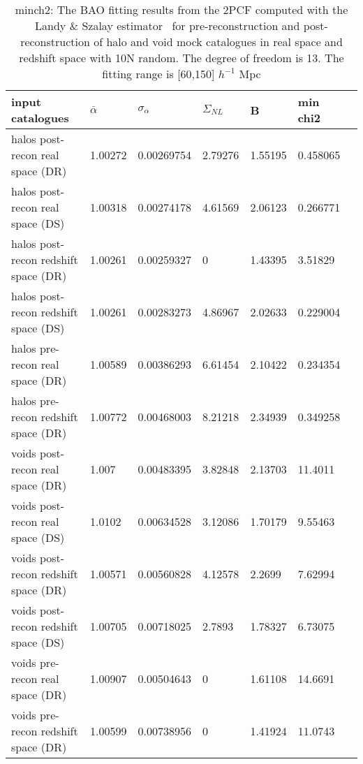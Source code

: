 \begin{table*}
\caption{minch2: The BAO fitting results from the 2PCF computed with the Landy $\&$ Szalay estimator~\cite{Landy1993} for pre-reconstruction and  post-reconstruction of halo and void mock catalogues in real space and redshift space with 10N random. The degree of freedom is 13. The fitting range is [60,150] $h^{-1}$ Mpc}
\label{tab:LS}
\begin{tabular}{lllllll}
\hline
input catalogues &  $\bar{\alpha}$ &  $\sigma_{\alpha}$ &       $\Sigma_{NL}$ &        B &  min chi2 \\
\hline
halos post-recon real space (DR)     & 1.00272 & 0.00269754 & 2.79276 & 1.55195 & 0.458065 \\
halos post-recon real space (DS)     & 1.00318 & 0.00274178 & 4.61569 & 2.06123 & 0.266771 \\
halos post-recon redshift space (DR) & 1.00261 & 0.00259327 & 0       & 1.43395 & 3.51829  \\
halos post-recon redshift space (DS) & 1.00261 & 0.00283273 & 4.86967 & 2.02633 & 0.229004 \\
halos pre-recon real space (DR)      & 1.00589 & 0.00386293 & 6.61454 & 2.10422 & 0.234354 \\
halos pre-recon redshift space (DR)  & 1.00772 & 0.00468003 & 8.21218 & 2.34939 & 0.349258 \\
\hline
voids post-recon real space (DR)     & 1.007   & 0.00483395 & 3.82848 & 2.13703 & 11.4011  \\
voids post-recon real space (DS)     & 1.0102  & 0.00634528 & 3.12086 & 1.70179 & 9.55463  \\
voids post-recon redshift space (DR) & 1.00571 & 0.00560828 & 4.12578 & 2.2699  & 7.62994  \\
voids post-recon redshift space (DS) & 1.00705 & 0.00718025 & 2.7893  & 1.78327 & 6.73075  \\
voids pre-recon real space (DR)      & 1.00907 & 0.00504643 & 0       & 1.61108 & 14.6691  \\
voids pre-recon redshift space (DR)  & 1.00599 & 0.00738956 & 0       & 1.41924 & 11.0743  \\
\hline
\end{tabular}
\end{table*}

